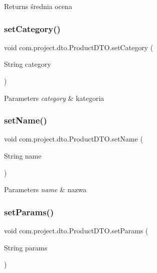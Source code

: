 \begin{DoxyReturn}{Returns}
średnia ocena 
\end{DoxyReturn}
\mbox{\label{classcom_1_1project_1_1dto_1_1_product_d_t_o_a7c7eec99e2bf4bb4dd209ac9ac9bd8bd}} 
\subsubsection{set\+Category()}
{\footnotesize\ttfamily void com.\+project.\+dto.\+Product\+D\+T\+O.\+set\+Category (\begin{DoxyParamCaption}\item[{String}]{category }\end{DoxyParamCaption})}


\begin{DoxyParams}{Parameters}
{\em category} & kategoria \\
\hline
\end{DoxyParams}
\mbox{\label{classcom_1_1project_1_1dto_1_1_product_d_t_o_a56758c0bba18386d8581b7108997f7ac}} 
\subsubsection{set\+Name()}
{\footnotesize\ttfamily void com.\+project.\+dto.\+Product\+D\+T\+O.\+set\+Name (\begin{DoxyParamCaption}\item[{String}]{name }\end{DoxyParamCaption})}


\begin{DoxyParams}{Parameters}
{\em name} & nazwa \\
\hline
\end{DoxyParams}
\mbox{\label{classcom_1_1project_1_1dto_1_1_product_d_t_o_a3d1861ed5dfed6287219c2e258f3698b}} 
\subsubsection{set\+Params()}
{\footnotesize\ttfamily void com.\+project.\+dto.\+Product\+D\+T\+O.\+set\+Params (\begin{DoxyParamCaption}\item[{String}]{params }\end{DoxyParamCaption})}


